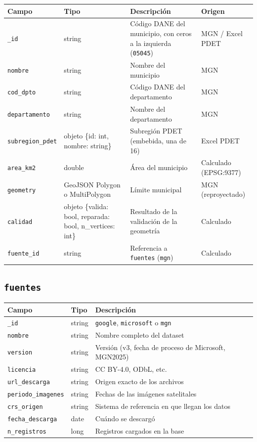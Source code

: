 \documentclass[11pt,a4paper]{article}
\newcommand{\campo}[1]{\texttt{#1}}
\begin{document}
\begin{table}[H]
\centering\small
\begin{tabularx}{\textwidth}{@{}p{3cm}p{3.6cm}Lp{2.6cm}@{}}
\toprule
\textbf{Campo} & \textbf{Tipo} & \textbf{Descripción} & \textbf{Origen} \\
\midrule
\campo{\_id} & string  & Código DANE del municipio, con ceros a la izquierda (\campo{05045}) & MGN / Excel PDET \\
\campo{nombre} & string & Nombre del municipio & MGN \\
\campo{cod\_dpto} & string  & Código DANE del departamento & MGN \\
\campo{departamento} & string & Nombre del departamento & MGN \\
\campo{subregion\_pdet} & objeto \{id: int, nombre: string\} & Subregión PDET (embebida, una de 16) & Excel PDET \\
\campo{area\_km2} & double & Área del municipio & Calculado (EPSG:9377) \\
\campo{geometry} & GeoJSON Polygon o MultiPolygon & Límite municipal & MGN (reproyectado) \\
\campo{calidad} & objeto \{valida: bool, reparada: bool, n\_vertices: int\} & Resultado de la validación de la geometría & Calculado \\
\campo{fuente\_id} & string & Referencia a \campo{fuentes} (\campo{mgn}) & Calculado \\
\bottomrule
\end{tabularx}
\end{table}

\subsection{\texorpdfstring{\campo{fuentes}}{fuentes}}

\begin{table}[H]
\centering\small
\begin{tabularx}{\textwidth}{@{}p{3.4cm}p{2.4cm}L@{}}
\toprule
\textbf{Campo} & \textbf{Tipo} & \textbf{Descripción} \\
\midrule
\campo{\_id} & string & \campo{google}, \campo{microsoft} o \campo{mgn} \\
\campo{nombre} & string & Nombre completo del dataset \\
\campo{version} & string & Versión (v3, fecha de proceso de Microsoft, MGN2025) \\
\campo{licencia} & string & CC BY-4.0, ODbL, etc. \\
\campo{url\_descarga} & string & Origen exacto de los archivos \\
\campo{periodo\_imagenes} & string & Fechas de las imágenes satelitales \\
\campo{crs\_origen} & string & Sistema de referencia en que llegan los datos \\
\campo{fecha\_descarga} & date & Cuándo se descargó \\
\campo{n\_registros} & long & Registros cargados en la base \\
\bottomrule
\end{tabularx}
\end{table}
\end{document}
